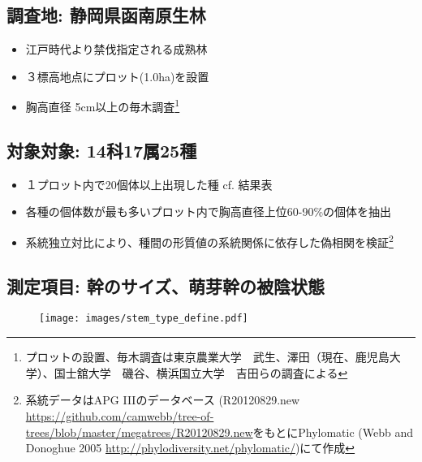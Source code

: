 \documentclass[a0, 30pt, plainboxedsections, draft]{sciposter} %
\begin{document}
\begin{multicols}{2}%

\subsection*{調査地: 静岡県函南原生林}

\begin{itemize}\setlength{\itemindent}{0.6em}
  \item 江戸時代より禁伐指定される成熟林
  \item ３標高地点にプロット(1.0ha)を設置
  \item 胸高直径 5cm以上の毎木調査\footnote{プロットの設置、毎木調査は東京農業大学　武生、澤田（現在、鹿児島大学）、国士舘大学　磯谷、横浜国立大学　吉田らの調査による}
\end{itemize}

\subsection*{対象対象: 14科17属25種}

\begin{itemize}\setlength{\itemindent}{0.6em}
  \item １プロット内で20個体以上出現した種 cf. 結果表
  \item 各種の個体数が最も多いプロット内で胸高直径上位60-90\%の個体を抽出
  \item 系統独立対比により、種間の形質値の系統関係に依存した偽相関を検証\footnote{系統データはAPG I\hspace{-1pt}I\hspace{-1pt}Iのデータベース (R20120829.new \url{https://github.com/camwebb/tree-of-trees/blob/master/megatrees/R20120829.new}をもとにPhylomatic (Webb and Donoghue 2005 \url{http://phylodiversity.net/phylomatic/})にて作成}
\end{itemize}

\columnbreak
\subsection*{測定項目: 幹のサイズ、萌芽幹の被陰状態}

\begin{figure}
	\texttt{[image: images/stem\_type\_define.pdf]}
\end{figure}

\vspace{-1.8em}\begin{figure}
 \begin{minipage}{0.6\hsize}

\end{minipage}
\end{figure}
\end{multicols}
\end{document}
